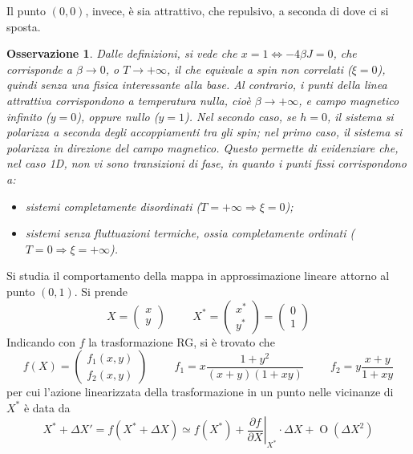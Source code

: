 \documentclass[11pt, a4paper]{scrartcl}
\theoremstyle{style}
\newtheorem{osservazione}{Osservazione}[section]
\theoremstyle{style1}
\newcommand*\Eval[3]{\left.#1\right\rvert_{#2}^{#3}}
\numberwithin{equation}{subsection}
\begin{document}
Il punto $(0,0)$, invece, \`e sia attrattivo, che repulsivo, a seconda di dove ci si sposta.
\begin{osservazione}
Dalle definizioni, si vede che $x=1 \iff -4 \beta  J = 0$, che corrisponde a $\beta  \to  0$, o $T\to +\infty$, il che equivale a spin non correlati ($\xi =0$), quindi senza una fisica interessante alla base.
Al contrario, i punti della linea attrattiva corrispondono a temperatura nulla, cio\`e $\beta \to +\infty$, e campo magnetico infinito ($y=0$), oppure nullo ($y=1$).
Nel secondo caso, se $h=0$, il sistema si polarizza a seconda degli accoppiamenti tra gli spin; nel primo caso, il sistema si polarizza in direzione del campo magnetico. 
Questo permette di evidenziare che, nel caso 1D, non vi sono transizioni di fase, in quanto i punti fissi corrispondono a:
\begin{itemize}
	\item sistemi completamente disordinati ($T=+\infty\Rightarrow \xi =0$);
	\item sistemi senza fluttuazioni termiche, ossia completamente ordinati ($T=0\Rightarrow \xi = +\infty$).
\end{itemize}
\end{osservazione}
\noindent Si studia il comportamento della mappa in approssimazione lineare attorno al punto $(0,1)$.
Si prende 
\[
X = \begin{pmatrix} x \\ y \end{pmatrix} \hspace{1cm} X^* = \begin{pmatrix} x^* \\ y^* \end{pmatrix} = \begin{pmatrix} 0 \\ 1 \end{pmatrix} 
\] 
Indicando con $f$ la trasformazione RG, si \`e trovato che
\[
f(X) = \begin{pmatrix} f_1(x,y) \\ f_2(x,y) \end{pmatrix}  \hspace{1cm} f_1 = x \frac{1+y^2}{(x+y)(1+xy)} \hspace{1cm} f_2 = y \frac{x+y}{1 + xy}
\] 
per cui l'azione linearizzata della trasformazione in un punto nelle vicinanze di $X^*$ \`e data da
\[
	X^* + \Delta X' = f \left(X^* + \Delta X\right)  \simeq f(X^*) + \Eval{\frac{\partial f}{\partial X} }{X^*}{}\cdot \Delta X + \operatorname{O} \left(\Delta X^2\right) 
\] 
\end{document}
